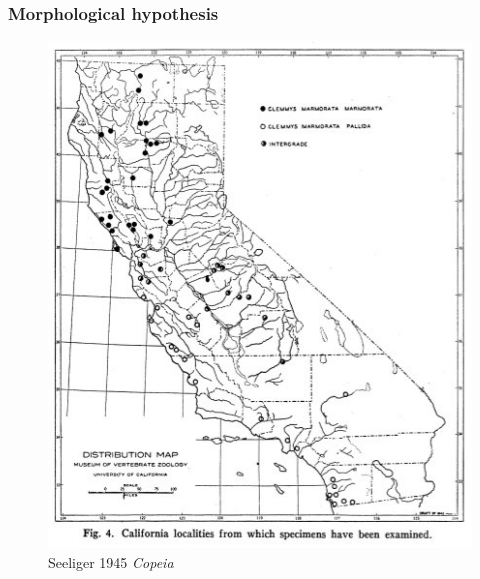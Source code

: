 \documentclass{beamer}\usepackage{graphicx, color}
\begin{document}
\begin{frame}
  \frametitle{Morphological hypothesis}

  \begin{figure}[h]
    \centering
    \captionsetup{justification = raggedleft, slc = off}
    \includegraphics[height = 0.8\textheight, keepaspectratio = true]{figure/seeliger}
    \caption*{\scriptsize{Seeliger 1945 \textit{Copeia}}}
    \label{fig:seeliger}
  \end{figure}

\end{frame}
\end{document}
